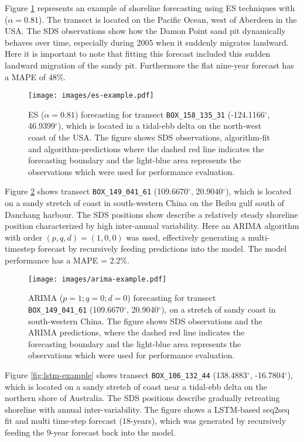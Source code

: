 \documentclass[format=sigconf, review=false, screen=true]{acmart}
\begin{document}
Figure \ref{fig:es-example} represents an example of shoreline forecasting using ES techniques with ($\alpha=0.81$). The transect is located on the Pacific Ocean, west of Aberdeen in the USA. The SDS observations show how the Damon Point sand pit dynamically behaves over time, especially during 2005 when it suddenly migrates landward. Here it is important to note that fitting this forecast included this sudden landward migration of the sandy pit. Furthermore the flat nine-year forecast has a MAPE of $48\%$.  

\begin{figure}[h]
	\centering
	\texttt{[image: images/es-example.pdf]}
	\caption{ES ($\alpha=0.81$) forecasting for transect \texttt{BOX\_158\_135\_31} (-124.1166$^\circ$, 46.9399$^\circ$), which is located in a tidal-ebb delta on the north-west coast of the USA. The figure shows SDS observations, algorithm-fit and algorithm-predictions where the dashed red line indicates the forecasting boundary and the light-blue area represents the observations which were used for performance evaluation.}
	\label{fig:es-example}
\end{figure}

Figure \ref{fig:arima-example} shows transect \texttt{BOX\_149\_041\_61} (109.6670$^\circ$, 20.9040$^\circ$), which is located on a sandy stretch of coast in south-western China on the Beibu gulf south of Danchang harbour. The SDS positions show describe a relatively steady shoreline position characterized by high inter-annual variability. Here an ARIMA algorithm with order $(p,q,d) = (1, 0, 0)$ was used, effectively generating a multi-timestep forecast by recursively feeding predictions into the model. The model performance has a MAPE = $2.2\%$. 

\begin{figure}[h]
	\centering
	\texttt{[image: images/arima-example.pdf]}
	\caption{ARIMA ($p=1; q=0; d=0$) forecasting for transect \texttt{BOX\_149\_041\_61} (109.6670$^\circ$, 20.9040$^\circ$), on a stretch of sandy coast in south-western China. The figure shows SDS observations and the ARIMA predictions, where the dashed red line indicates the forecasting boundary and the light-blue area represents the observations which were used for performance evaluation.}
	\label{fig:arima-example}
\end{figure}

Figure \ref{fig:lstm-example} shows transect \texttt{BOX\_106\_132\_44} (138.4883$^\circ$, -16.7804$^\circ$), which is located on a sandy stretch of coast near a tidal-ebb delta on the northern shore of Australia. The SDS positions describe gradually retreating shoreline with annual inter-variability. The figure shows a LSTM-based seq2seq fit and multi time-step forecast (18-years), which was generated by recursively feeding the 9-year forecast back into the model.  
\end{document}
